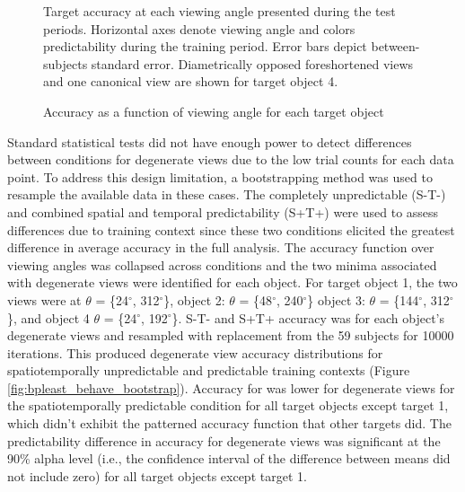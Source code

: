 \documentclass[dwyatte_dissertation.tex]{subfiles}
\begin{document}
\begin{figure}[h!]
\begin{center}
\begin{tabular}{ll}
\end{tabular}
\end{center}
\caption{Accuracy as a function of viewing angle for each target object}{Target accuracy at each viewing angle presented during the test periods. Horizontal axes denote viewing angle and colors predictability during the training period. Error bars depict between-subjects standard error. Diametrically opposed foreshortened views and one canonical view are shown for target object 4.}
\label{fig:bpleast_behave_rot}
\end{figure}

Standard statistical tests did not have enough power to detect differences between conditions for degenerate views due to the low trial counts for each data point. To address this design limitation, a bootstrapping method was used to resample the available data in these cases. The completely unpredictable (S-T-) and combined spatial and temporal predictability (S+T+) were used to assess differences due to training context since these two conditions elicited the greatest difference in average accuracy in the full analysis. The accuracy function over viewing angles was collapsed across conditions and the two minima associated with degenerate views were identified for each object. For target object 1, the two views were at $\theta$ = \{24$^\circ$, 312$^\circ$\}, object 2: $\theta$ = \{48$^\circ$, 240$^\circ$\} object 3: $\theta$ = \{144$^\circ$, 312$^\circ$\}, and object 4 $\theta$ = \{24$^\circ$, 192$^\circ$\}. S-T- and S+T+ accuracy was for each object's degenerate views and resampled with replacement from the 59 subjects for 10000 iterations. This produced degenerate view accuracy distributions for spatiotemporally unpredictable and predictable training contexts (Figure \ref{fig:bpleast_behave_bootstrap}). Accuracy for was lower for degenerate views for the spatiotemporally predictable condition for all target objects except target 1, which didn't exhibit the patterned accuracy function that other targets did. The predictability difference in accuracy for degenerate views was significant at the 90\% alpha level (i.e., the confidence interval of the difference between means did not include zero) for all target objects except target 1.
\end{document}
